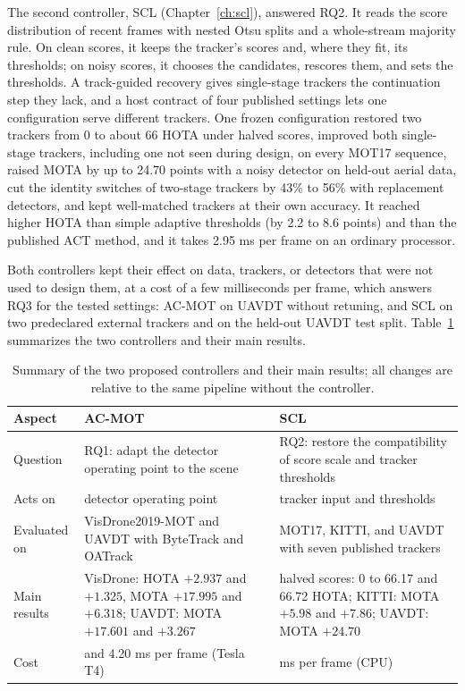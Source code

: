 The second controller, SCL (Chapter~\ref{ch:scl}), answered RQ2. It reads the score distribution of recent frames with nested Otsu splits and a whole-stream majority rule. On clean scores, it keeps the tracker's scores and, where they fit, its thresholds; on noisy scores, it chooses the candidates, rescores them, and sets the thresholds. A track-guided recovery gives single-stage trackers the continuation step they lack, and a host contract of four published settings lets one configuration serve different trackers. One frozen configuration restored two trackers from 0 to about 66 HOTA under halved scores, improved both single-stage trackers, including one not seen during design, on every MOT17 sequence, raised MOTA by up to 24.70 points with a noisy detector on held-out aerial data, cut the identity switches of two-stage trackers by 43\% to 56\% with replacement detectors, and kept well-matched trackers at their own accuracy. It reached higher HOTA than simple adaptive thresholds (by 2.2 to 8.6 points) and than the published ACT method, and it takes 2.95 ms per frame on an ordinary processor.

Both controllers kept their effect on data, trackers, or detectors that were not used to design them, at a cost of a few milliseconds per frame, which answers RQ3 for the tested settings: AC-MOT on UAVDT without retuning, and SCL on two predeclared external trackers and on the held-out UAVDT test split. Table~\ref{tab:conc-summary} summarizes the two controllers and their main results.

\begin{table}[tbp]
\centering
\caption{Summary of the two proposed controllers and their main results; all changes are relative to the same pipeline without the controller.}
\label{tab:conc-summary}
\begin{tabular}{>{\raggedright\arraybackslash}p{2.7cm}>{\raggedright\arraybackslash}p{5.6cm}>{\raggedright\arraybackslash}p{5.6cm}}
\toprule
Aspect & AC-MOT & SCL\\
\midrule
Question & RQ1: adapt the detector operating point to the scene & RQ2: restore the compatibility of score scale and tracker thresholds\\
Acts on & detector operating point & tracker input and thresholds\\
Evaluated on & VisDrone2019-MOT and UAVDT with ByteTrack and OATrack & MOT17, KITTI, and UAVDT with seven published trackers\\
Main results & VisDrone: HOTA $+2.937$ and $+1.325$, MOTA $+17.995$ and $+6.318$; UAVDT: MOTA $+17.601$ and $+3.267$ & halved scores: 0 to 66.17 and 66.72 HOTA; KITTI: MOTA $+5.98$ and $+7.86$; UAVDT: MOTA $+24.70$\\
Cost & 4.26 and 4.20 ms per frame (Tesla T4) & 2.95 ms per frame (CPU)\\
\bottomrule
\end{tabular}
\end{table}

